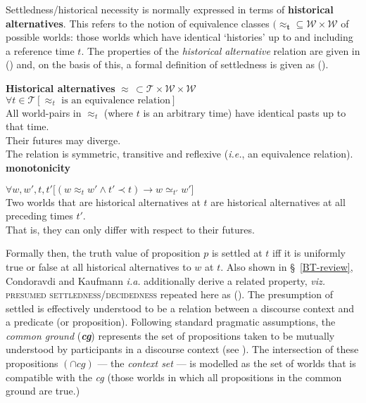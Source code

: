 
Settledness/historical necessity is normally expressed in terms of \textbf{historical alternatives}. This refers to the notion of equivalence classes $\boldsymbol{(\approx_{t}}\subseteq\mathcal{W\times W}$ of possible worlds: those worlds which have identical `histories' up to and including a reference time $t$. The properties of the \textit{historical alternative} relation are given in (\nextx) and, on the basis of this, a formal definition of settledness is given as (\anextx).

\pex\textbf{Historical alternatives }$\boldsymbol\approx\,\subset\mathcal{T\times W\times W}$
\a $\forall t\in\mathcal T[\approx_t\text{ is an equivalence relation}]$\\
All world-pairs in $\approx_t$ (where $ t $ is an arbitrary time) have identical pasts up to that time.\\Their futures may diverge.\\
The relation is symmetric, transitive and reflexive (\textit{i.e.}, an equivalence relation).
\a\textbf{monotonicity}

$ \forall w,w',t,t'\big[(w\approx_t w'\wedge t'\prec t)\to w\simeq_{t'} w'\big]$\\
Two worlds that are historical alternatives at $t$ are historical alternatives at all preceding times $t'$.\\That is, they can only differ with respect to their futures.
\xe

Formally then, the truth value of proposition $ p $ is settled at $ t $ iff it is uniformly true or false at all historical alternatives to $ w $ at $ t $. Also shown in \S~\ref{BT-review}, Condoravdi and Kaufmann \textit{i.a.} additionally derive a related property, \textit{viz.} \textsc{presumed settledness/decidedness} repeated here as (). The presumption of settled is effectively understood to be a relation between a discourse context and a predicate (or proposition). Following standard pragmatic assumptions, the \textit{common ground} (\textbf{\textit{cg}}) represents the set of propositions taken to be mutually understood by participants in a discourse context (see ). The intersection of these propositions $ (\cap cg )$ --- the \textit{context set} --- is modelled as the set of worlds that is compatible with the \textit{cg} (those worlds in which all propositions in the common ground are true.)

